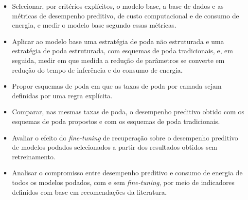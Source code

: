 \begin{itemize}
    \item Selecionar, por critérios explícitos, o modelo base, a base de dados e as métricas
          de desempenho preditivo, de custo computacional e de consumo de energia, e medir o
          modelo base segundo essas métricas.
    \item Aplicar ao modelo base uma estratégia de poda não estruturada e uma estratégia de
          poda estruturada, com esquemas de poda tradicionais, e, em seguida, medir em que
          medida a redução de parâmetros se converte em redução do tempo de inferência e do
          consumo de energia.
    \item Propor esquemas de poda em que as taxas de poda por camada sejam definidas por uma
          regra explícita.
    \item Comparar, nas mesmas taxas de poda, o desempenho preditivo obtido com os esquemas de
          poda propostos e com os esquemas de poda tradicionais.
    \item Avaliar o efeito do \textit{fine-tuning} de recuperação sobre o desempenho preditivo
          de modelos podados selecionados a partir dos resultados obtidos sem retreinamento.
    \item Analisar o compromisso entre desempenho preditivo e consumo de energia de todos os
          modelos podados, com e sem \textit{fine-tuning}, por meio de indicadores definidos com
          base em recomendações da literatura.
\end{itemize}

